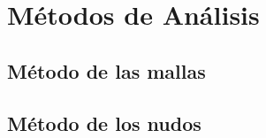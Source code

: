 \documentclass[xcolor={usenames,svgnames,dvipsnames}]{beamer}
\begin{document}
\section{Métodos de Análisis}
\label{sec:org586ea69}

\subsection{Método de las mallas}
\label{sec:orge678558}

\subsection{Método de los nudos}
\label{sec:org0ce5e43}
\end{document}
